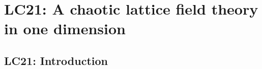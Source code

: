 

\chapter{LC21: A chaotic lattice field theory in one dimension}
\label{chap:LC21}


\renewcommand{\statesp}{state space}
\renewcommand{\Statesp}{State space}
\renewcommand{\Refl}{\ensuremath{\sigma}}             %
\renewcommand{\shift}{\ensuremath{r}}
\renewcommand{\hopMat}{\shift} %
\renewcommand{\ssp}{\ensuremath{\phi}}             %
\renewcommand{\Xx}{\ensuremath{\mathsf{\Phi}}}      %
\renewcommand{\Ssym}[1]{{\ensuremath{m_{#1}}}}    %

\section{LC21: Introduction}
\label{s:LC21intro}
        \begin{quote} %
        \end{quote} %
    
\newpage %
    
\newpage %
    
    
    
\newpage %
    
\newpage %
    
\newpage %
    
\newpage %
    
\newpage %
    
\newpage %
    

\renewcommand{\Refl}{\ensuremath{\sigma}}             %
\renewcommand{\shift}{\ensuremath{d}}                 %
\renewcommand{\ssp}{x}
\renewcommand{\Xx}{\ensuremath{\mathsf{X}}}      %
\renewcommand{\Ssym}[1]{{\ensuremath{s_{#1}}}}  %

\printbibliography[heading=subbibintoc,title={References}]
